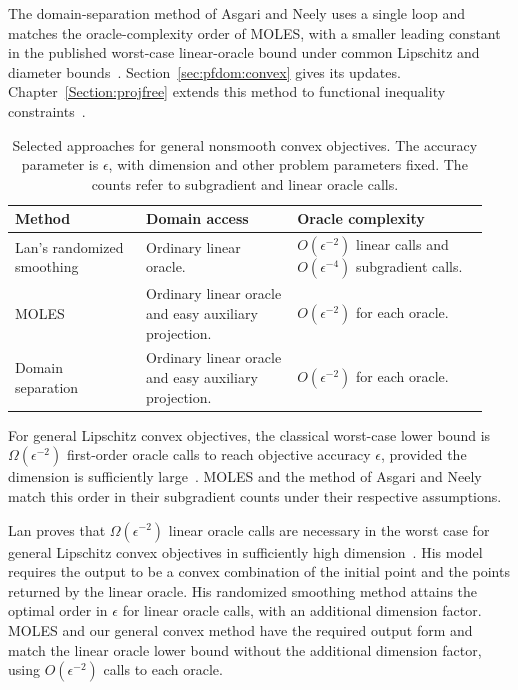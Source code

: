 The domain-separation method of Asgari and Neely
\cite{asgari2024nonsmooth} uses a single loop and matches the
oracle-complexity order of MOLES, with a smaller leading constant in the
published worst-case linear-oracle bound under common Lipschitz and diameter
bounds~\cite[Appendix~C.2.2]{thekumparampil2020projection}.
Section~\ref{sec:pfdom:convex} gives its updates.
Chapter~\ref{Section:projfree} extends this method to functional
inequality constraints~\cite{asgari2024nonsmooth}.

\begin{table}[htbp]
\centering
\caption{Selected approaches for general nonsmooth convex objectives.
The accuracy parameter is $\epsilon$, with dimension and other problem
parameters fixed. The counts refer to subgradient and linear oracle calls.}
\label{tab:pfdom:general-related}
\small
\renewcommand{\arraystretch}{1.25}
\setlength{\tabcolsep}{4pt}
\begin{tabular}{@{}>{\raggedright\arraybackslash}p{0.26\linewidth}>{\raggedright\arraybackslash}p{0.30\linewidth}>{\raggedright\arraybackslash}p{0.38\linewidth}@{}}
\toprule
Method & Domain access & Oracle complexity\\
\midrule
Lan's randomized smoothing~\cite{lan2014complexity}
 & Ordinary linear oracle.
 & $O(\epsilon^{-2})$ linear calls and $O(\epsilon^{-4})$ subgradient calls.\\[3pt]
MOLES~\cite{thekumparampil2020projection}
 & Ordinary linear oracle and easy auxiliary projection.
 & $O(\epsilon^{-2})$ for each oracle.\\[3pt]
Domain separation~\cite{asgari2024nonsmooth}
 & Ordinary linear oracle and easy auxiliary projection.
 & $O(\epsilon^{-2})$ for each oracle.\\
\bottomrule
\end{tabular}
\end{table}

For general Lipschitz convex objectives, the classical worst-case
lower bound is $\Omega(\epsilon^{-2})$ first-order oracle calls
to reach objective accuracy $\epsilon$, provided the dimension is
sufficiently large~\cite{nemirovskij1983problem,bubeck2015convex}.
MOLES and the method of Asgari and Neely match this order in their
subgradient counts under their respective assumptions.

Lan proves that $\Omega(\epsilon^{-2})$ linear oracle calls are
necessary in the worst case for general Lipschitz convex objectives
in sufficiently high dimension~\cite[Section~2.3]{lan2014complexity}.
His model requires the output to be a convex combination of the
initial point and the points returned by the linear oracle.
His randomized smoothing method attains the optimal order in
$\epsilon$ for linear oracle calls, with an additional dimension
factor.
MOLES and our general convex method have the required output form
and match the linear oracle lower bound without the additional dimension
factor, using $O(\epsilon^{-2})$ calls to each oracle.


